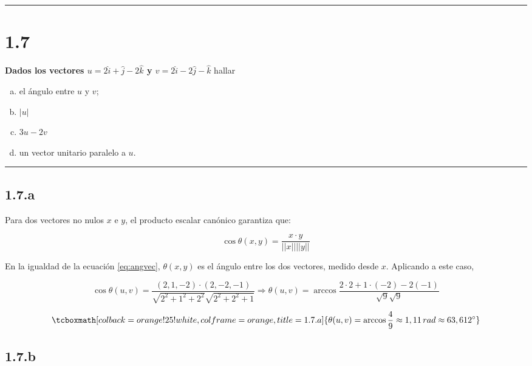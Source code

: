 \documentclass{article}
\begin{document}
\hrule
\vspace{10 pt}

\section*{1.7}
\label{sec:1.7}

\textbf{Dados los vectores $u = 2 \hat{i} + \hat{j} -2\hat{k}$ y $v = 2\hat{i} - 2\hat{j}-\hat{k}$} hallar 

\begin{enumerate}[(a)]
\bfseries
\item el ángulo entre $u$ y $v$;

\item $|u|$

\item $3u - 2v$

\item un vector unitario paralelo a $u$.
\end{enumerate}
\hrule

\subsection*{1.7.a}
\label{subsec:1.7.a}

Para dos vectores no nulos $x$ e $y$, el producto escalar canónico garantiza que:

\begin{equation}
\cos \theta(x,y) = \frac{x \cdot y}{||x|| ||y||}
\label{eq:angvec}
\end{equation}

En la igualdad de la ecuación \ref{eq:angvec}, $\theta(x, y)$ es el ángulo entre los dos vectores, medido desde $x$. Aplicando a este caso,

\begin{equation}
\cos \theta(u,v) = \frac{(2, 1, -2) \cdot (2, -2, -1)}{\sqrt{2^2 + 1^2 + 2^2} \sqrt{2^2 + 2^2 + 1}} \Rightarrow \theta(u, v) =  \arccos \frac{2 \cdot 2 + 1 \cdot (-2) -2 (-1)}{\sqrt{9} \sqrt{9}}
\end{equation}

\begin{equation}
\tcboxmath[colback=orange!25!white,colframe=orange,title=1.7.a]
{ \theta(u, v) = \arccos \frac{4}{9} \approx 1,11 \mathop{rad} \approx 63,612^{\circ} }
\end{equation}

\subsection*{1.7.b}
\label{subsec:1.7.b}
\end{document}
